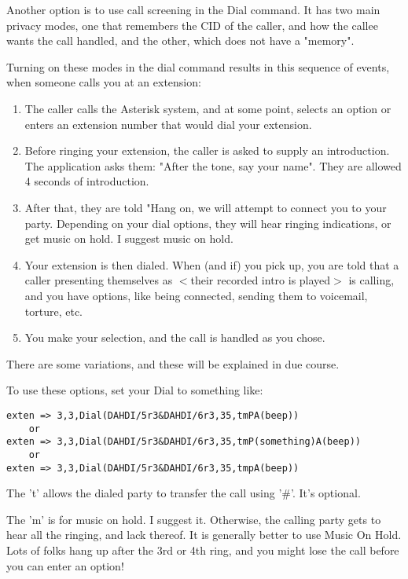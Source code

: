 Another option is to use call screening in the Dial command. It has
two main privacy modes, one that remembers the CID of the caller, and
how the callee wants the call handled, and the other, which does not
have a "memory".

Turning on these modes in the dial command results in this sequence of
events, when someone calls you at an extension:

\begin{enumerate}
\item The caller calls the Asterisk system, and at some point, selects an
option or enters an extension number that would dial your extension.

\item Before ringing your extension, the caller is asked to supply an
introduction. The application asks them: "After the tone, say your
name". They are allowed 4 seconds of introduction.

\item After that, they are told "Hang on, we will attempt to connect you
to your party. Depending on your dial options, they will hear ringing
indications, or get music on hold. I suggest music on hold.

\item Your extension is then dialed. When (and if) you pick up, you are
told that a caller presenting themselves as $<$their recorded intro is
played$>$ is calling, and you have options, like being connected,
sending them to voicemail, torture, etc.

\item You make your selection, and the call is handled as you chose.
\end{enumerate}

There are some variations, and these will be explained in due course.


To use these options, set your Dial to something like:
\begin{astlisting}
\begin{verbatim}
exten => 3,3,Dial(DAHDI/5r3&DAHDI/6r3,35,tmPA(beep))
    or
exten => 3,3,Dial(DAHDI/5r3&DAHDI/6r3,35,tmP(something)A(beep))
    or
exten => 3,3,Dial(DAHDI/5r3&DAHDI/6r3,35,tmpA(beep))
\end{verbatim}
\end{astlisting}

The 't' allows the dialed party to transfer the call using '\#'. It's
optional.

The 'm' is for music on hold. I suggest it. Otherwise, the calling
party gets to hear all the ringing, and lack thereof. It is generally
better to use Music On Hold. Lots of folks hang up after the 3rd or
4th ring, and you might lose the call before you can enter an option!


